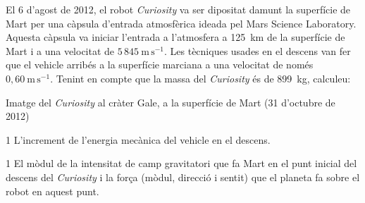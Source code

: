 El 6 d'agost de 2012, el robot \textit{Curiosity} va ser dipositat damunt la superfície de Mart per una càpsula d'entrada atmosfèrica ideada pel Mars Science Laboratory. Aquesta càpsula va iniciar l'entrada a l'atmosfera a 125~km de la superfície de Mart i a una velocitat de $5\,845\ \mathrm{m\,s^{-1}}$. Les tècniques usades en el descens van fer que el vehicle arribés a la superfície marciana a una velocitat de només $0,60\ \mathrm{m\,s^{-1}}$. Tenint en compte que la massa del \textit{Curiosity} és de 899~kg, calculeu:

{\centering\small Imatge del \textit{Curiosity} al cràter Gale, a la superfície de Mart (31 d'octubre de 2012)\par}

\begin{apartat}{1}
L'increment de l'energia mecànica del vehicle en el descens.
\end{apartat}

\begin{apartat}{1}
El mòdul de la intensitat de camp gravitatori que fa Mart en el punt inicial del descens del \textit{Curiosity} i la força (mòdul, direcció i sentit) que el planeta fa sobre el robot en aquest punt.
\end{apartat}

